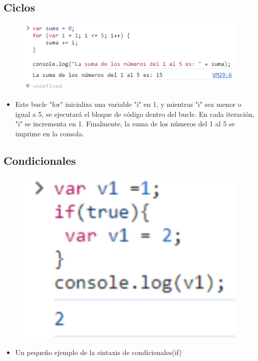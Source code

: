 \documentclass{article}
\begin{document}
	\subsection{Ciclos}
	\begin{figure}[H]
		\centering
		\includegraphics[width=1.0\textwidth,keepaspectratio]{img/Ciclos.PNG}
	\end{figure}
	\begin{itemize}
		\item Este bucle "for" inicializa una variable "i" en 1, y mientras "i" sea menor o igual a 5, se ejecutará el bloque de código dentro del bucle. En cada iteración, "i" se incrementa en 1. Finalmente, la suma de los números del 1 al 5 se imprime en la consola.
	\end{itemize} 
	\subsection{Condicionales}
	\begin{figure}[H]
		\centering
		\includegraphics[width=1.0\textwidth,keepaspectratio]{img/Condicionales.PNG}
	\end{figure}
	\begin{itemize}
		\item Un pequeño ejemplo de la sintaxis de condicionales(if)
	\end{itemize} 
\end{document}
